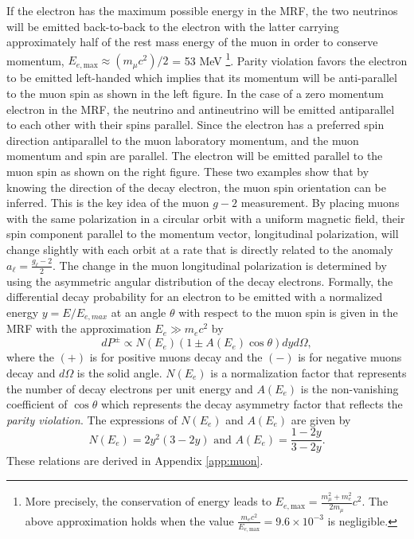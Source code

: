 \documentclass{outhesis}
\begin{document}
If the electron has the maximum possible energy in the MRF, the two neutrinos will be emitted back-to-back to the electron with the latter carrying approximately half of the rest mass energy of the muon in order to conserve momentum, $E_{e,\text{max}} \approx \left(m_{\mu}c^2\right)/2$ = 53 MeV \footnote{More precisely, the conservation of energy leads to $\displaystyle E_{e,\text{max}} = \frac{m_{\mu}^2+m_e^2}{2m_{\mu}}c^2$. The above approximation holds when the value $\displaystyle \frac{m_e c^2}{E_{e,\text{max}}} = 9.6\times10^{-3}$ is negligible.}. Parity violation favors the electron to be emitted left-handed which implies that its momentum will be anti-parallel to the muon spin as shown in the left figure. In the case of a zero momentum electron in the MRF, the neutrino and antineutrino will be emitted antiparallel to each other with their spins parallel. Since the electron has a preferred spin direction antiparallel to the muon laboratory momentum, and the muon momentum and spin are parallel. The electron will be emitted parallel to the muon spin as shown on the right figure. These two examples show that by knowing the direction of the decay electron, the muon spin orientation can be inferred. This is the key idea of the muon $g-2$ measurement. By placing muons with the same polarization in a circular orbit with a uniform magnetic field, their spin component parallel to the momentum vector, longitudinal polarization, will change slightly with each orbit at a rate that is directly related to the anomaly $a_{\ell} = \frac{g_\ell-2}{2}$. The change in the muon longitudinal polarization is determined by using the asymmetric angular distribution of the decay electrons. Formally, the differential decay probability for an electron to be emitted with a normalized energy $y=E/E_{e,max}$ at an angle $\theta$ with respect to the muon spin is given in the MRF with the approximation $E_e \gg m_e c^2$ by
\begin{equation}
dP^{\pm} \propto N\left(E_e\right)\left(1 \pm A(E_e)\cos \theta \right) dy d\Omega,
\label{eq:prob}
\end{equation}
where the $(+)$ is for positive muons decay and the $(-)$ is for negative muons decay and $d\Omega$ is the solid angle. $N\left(E_e\right)$ is a normalization factor that represents the number of decay electrons per unit energy and $A\left(E_e\right)$ is the non-vanishing coefficient of $\cos \theta$ which represents the decay asymmetry factor that reflects the \emph{parity violation}. The expressions of $N\left(E_e\right)$ and $A\left(E_e\right)$ are given by
\begin{equation}
N\left(E_e\right) = 2y^2\left(3-2y\right)  \,\,  \text{and}  \,\,  A\left(E_e\right) = \frac{1-2y}{3-2y}.
\label{eq:na}
\end{equation}
These relations are derived in Appendix \ref{app:muon}.
\end{document}
